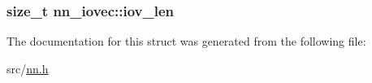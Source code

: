 \subsubsection[{iov\+\_\+len}]{\setlength{\rightskip}{0pt plus 5cm}size\+\_\+t nn\+\_\+iovec\+::iov\+\_\+len}\hypertarget{structnn__iovec_ae13415a807909521c74f6776515364b1}{}\label{structnn__iovec_ae13415a807909521c74f6776515364b1}


The documentation for this struct was generated from the following file\+:\begin{DoxyCompactItemize}
\item 
src/\hyperlink{nn_8h}{nn.\+h}\end{DoxyCompactItemize}
